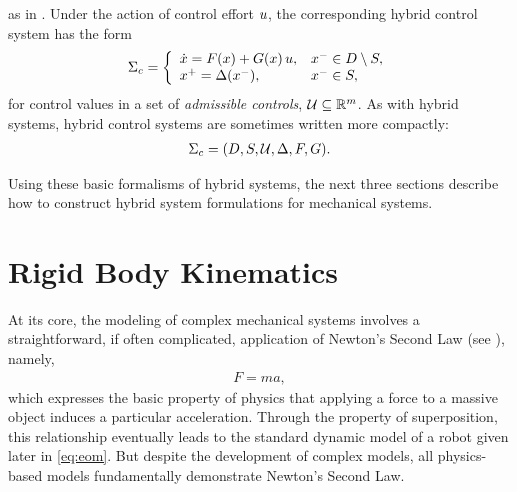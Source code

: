 as in \cite{Sinnet2009}.
%
Under the action of control effort $u$, the corresponding hybrid control
system has the form
%
\begin{align}
  \Sigma_{c} = \left\{
  \begin{array}{l l}
    {\dot {x}} = F(x) + G(x) \, u, & x^{-} \in D \setminus S,\\
    x^{+} = \Delta(x^{-}), & x^{-} \in S,
  \end{array}\right.
  \label{eq:hcsys}
\end{align}
%
for control values in a set of {\em admissible controls}, $\mathcal{U} \subseteq \mathbb{R}^{m}$.
%
As with hybrid systems, hybrid control systems are sometimes written more
compactly:
\begin{align*}
  \Sigma_{c} = (D, S, \mathcal{U}, \Delta, F, G).
\end{align*}

Using these basic formalisms of hybrid systems, the next three sections describe
how to construct hybrid system formulations for mechanical systems.

\section{Rigid Body Kinematics}

At its core, the modeling of complex mechanical systems involves a
straightforward, if often complicated, application of Newton's Second Law (see
\cite{Feynman1964}), namely,
\begin{align*}
  F = m a,
\end{align*}
which expresses the basic property of physics that applying a force to a massive
object induces a particular acceleration.
%
Through the property of superposition, this relationship eventually leads to the
standard dynamic model of a robot given later in \eqref{eq:eom}.
%
But despite the development of complex models, all physics-based models
fundamentally demonstrate Newton's Second Law.

